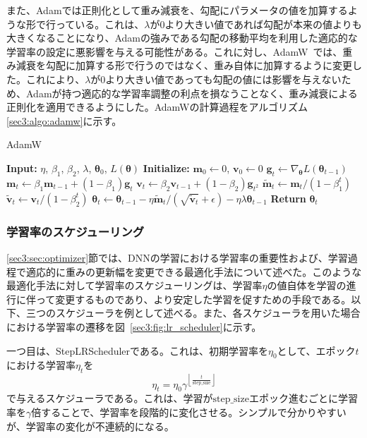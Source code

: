 \documentclass[12pt]{jarticle}
\numberwithin{equation}{section}    %
\numberwithin{figure}{section}      %
\numberwithin{table}{section}      %
\begin{document}
また、Adamでは正則化として重み減衰を、勾配にパラメータの値を加算するような形で行っている。これは、$\lambda$が0より大きい値であれば勾配が本来の値よりも大きくなることになり、Adamの強みである勾配の移動平均を利用した適応的な学習率の設定に悪影響を与える可能性がある。これに対し、AdamW~\cite{loshchilov2017decoupled}では、重み減衰を勾配に加算する形で行うのではなく、重み自体に加算するように変更した。これにより、$\lambda$が0より大きい値であっても勾配の値には影響を与えないため、Adamが持つ適応的な学習率調整の利点を損なうことなく、重み減衰による正則化を適用できるようにした。AdamWの計算過程をアルゴリズム\ref{sec3:algo:adamw}に示す。
\begin{algorithm}
    \caption{AdamW}
    \label{sec3:algo:adamw}
    \begin{algorithmic}[1]
        \State \textbf{Input:} $\eta$, $\beta_{1}$, $\beta_{2}$, $\lambda$, $\bm{\theta}_{0}$, $L(\bm{\theta})$
        \State \textbf{Initialize:} $\bm{m}_{0} \gets 0$, $\bm{v}_{0} \gets 0$
        \State $\bm{g}_{t} \gets \nabla_{\bm{\theta}} L(\bm{\theta}_{t-1})$
        \State $\bm{m}_{t} \gets \beta_{1} \bm{m}_{t-1} + (1 - \beta_{1}) \bm{g}_{t}$
        \State $\bm{v}_{t} \gets \beta_{2} \bm{v}_{t-1} + (1 - \beta_{2}) \bm{g}_{t^{2}}$
        \State $\tilde{\bm{m}}_{t} \gets \bm{m}_{t} / (1 - \beta_{1}^{t})$
        \State $\tilde{\bm{v}}_{t} \gets \bm{v}_{t} / (1 - \beta_{2}^{t})$
        \State $\bm{\theta}_{t} \gets \bm{\theta}_{t-1} - \eta \tilde{\bm{m}}_{t} / (\sqrt{\tilde{\bm{v}}_{t}} + \epsilon) - \eta \lambda \bm{\theta}_{t - 1}$
        \EndFor
        \State \textbf{Return} $\bm{\theta}_{t}$
    \end{algorithmic}
\end{algorithm}

\subsubsection{学習率のスケジューリング}
\ref{sec3:sec:optimizer}節では、DNNの学習における学習率の重要性および、学習過程で適応的に重みの更新幅を変更できる最適化手法について述べた。このような最適化手法に対して学習率のスケジューリングは、学習率$\eta$の値自体を学習の進行に伴って変更するものであり、より安定した学習を促すための手段である。以下、三つのスケジューラを例として述べる。また、各スケジューラを用いた場合における学習率の遷移を図~\ref{sec3:fig:lr_scheduler}に示す。

一つ目は、StepLRSchedulerである。これは、初期学習率を$\eta_{0}$として、エポック$t$における学習率$\eta_{t}$を
\begin{equation}
    \eta_{t} = \eta_{0} \gamma^{\left\lfloor \frac{t}{\text{step\_size}} \right\rfloor}
\end{equation}
で与えるスケジューラである。これは、学習が$\text{step\_size}$エポック進むごとに学習率を$\gamma$倍することで、学習率を段階的に変化させる。シンプルで分かりやすいが、学習率の変化が不連続的になる。
\end{document}

